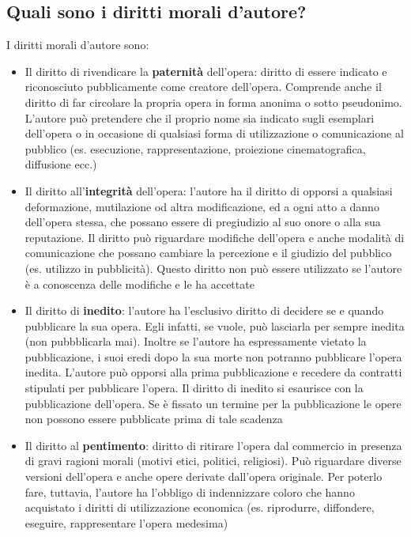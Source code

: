 \subsection{Quali sono i diritti morali d'autore?}
I diritti morali d'autore sono:
\begin{itemize}
    \item Il diritto di rivendicare la \textbf{paternità} dell'opera: \newline
    diritto di essere indicato e riconosciuto pubblicamente come creatore dell'opera.\newline
    Comprende anche il diritto di far circolare la propria opera in forma anonima o
    sotto pseudonimo. \newline
    L'autore può pretendere che il proprio nome sia indicato sugli esemplari dell'opera
    o in occasione di qualsiasi forma di utilizzazione o comunicazione al pubblico
    (es. esecuzione, rappresentazione, proiezione cinematografica, diffusione ecc.)
    \item Il diritto all'\textbf{integrità} dell'opera: l'autore ha il diritto di opporsi a qualsiasi
    deformazione, mutilazione od altra modificazione, ed a ogni atto a danno dell'opera stessa, che possano
    essere di pregiudizio al suo onore o alla sua reputazione.\newline
    Il diritto può riguardare modifiche dell'opera e anche modalità di comunicazione
    che possano cambiare la percezione e il giudizio del pubblico (es. utilizzo in pubblicità).
    Questo diritto non può essere utilizzato se l'autore è a conoscenza delle modifiche e le ha accettate
    \item Il diritto di \textbf{inedito}: l'autore ha l'esclusivo diritto di decidere se e quando
    pubblicare la sua opera. Egli infatti, se vuole, può lasciarla per sempre inedita (non pubbblicarla
    mai). Inoltre se l'autore ha espressamente vietato la pubblicazione, i suoi eredi dopo la sua morte
    non potranno pubblicare l'opera inedita.\newline
    L'autore può opporsi alla prima pubblicazione e recedere da contratti stipulati per pubblicare l'opera.\newline
    Il diritto di inedito si esaurisce con la pubblicazione dell'opera.\newline
    Se è fissato un termine per la pubblicazione le opere non possono essere pubblicate
    prima di tale scadenza
    \item Il diritto al \textbf{pentimento}: diritto di ritirare l'opera dal commercio in presenza
    di gravi ragioni morali (motivi etici, politici, religiosi).
    Può riguardare diverse versioni dell'opera e anche opere derivate dall'opera originale.\newline
    Per poterlo fare, tuttavia, l'autore ha l'obbligo di indennizzare coloro che hanno
    acquistato i diritti di utilizzazione economica (es. riprodurre, diffondere, eseguire, rappresentare
    l'opera medesima)
\end{itemize}

